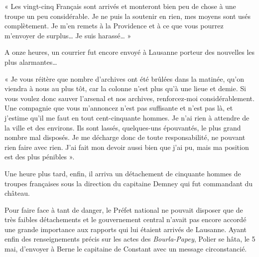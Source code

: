 \documentclass[french,twoside]{book} %
\newenvironment{quoteblock}%
  {\begin{quoting}}
  {\end{quoting}}
\newenvironment{quotebar}{%
    \def\FrameCommand{{\color{rubric!10!}\vrule width 0.5em} \hspace{0.9em}}%
    \def\OuterFrameSep{\itemsep} %
    \MakeFramed {\advance\hsize-\width \FrameRestore}
  }%
  {%
    \endMakeFramed
  }
\renewenvironment{quoteblock}%
  {%
    \savenotes
    \setstretch{0.9}
    \begin{quotebar}
  }
  {%
    \end{quotebar}
    \spewnotes
  }
\begin{document}
\begin{quoteblock}
 \noindent « Les vingt-cinq Français sont arrivés et monteront bien peu de chose à une troupe un peu considérable. Je ne puis la soutenir en rien, mes moyens sont usés complètement. Je m’en remets à la Providence et à ce que vous pourrez m’envoyer de surplus… Je suis harassé… »
 \end{quoteblock}

\noindent A onze heures, un courrier fut encore envoyé à Lausanne porteur des nouvelles les plus alarmantes…\par

\begin{quoteblock}
 \noindent « Je vous réitère que nombre d’archives ont été brûlées dans la matinée, qu’on viendra à nous au plus tôt, car la colonne n’est plus qu’à une lieue et demie. Si vous voulez donc sauver l’arsenal et nos archives, renforcez-moi considérablement. Une compagnie que vous m’annoncez n’est pas suffisante et n’est pas là, et j’estime qu’il me faut en tout cent-cinquante hommes. Je n’ai rien à attendre de la ville et des environs. Ils sont lassés, quelques-uns épouvantés, le plus grand nombre mal disposés. Je me décharge donc de toute responsabilité, ne pouvant rien faire avec rien. J’ai fait mon devoir aussi bien que j’ai pu, mais ma position est des plus pénibles ».
 \end{quoteblock}

\noindent Une heure plus tard, enfin, il arriva un détachement de cinquante hommes de troupes françaises sous la direction du capitaine Demney qui fut commandant du château.\par
Pour faire face à tant de danger, le Préfet national ne pouvait disposer que de très faibles détachements et le gouvernement central n’avait pas encore accordé une grande importance aux rapports qui lui étaient arrivés de Lausanne. Ayant enfin des renseignements précis sur les actes des \emph{Bourla-Papey}, Polier se hâta, le 5 mai, d’envoyer à Berne le capitaine de Constant avec un message circonstancié.\par
\end{document}
